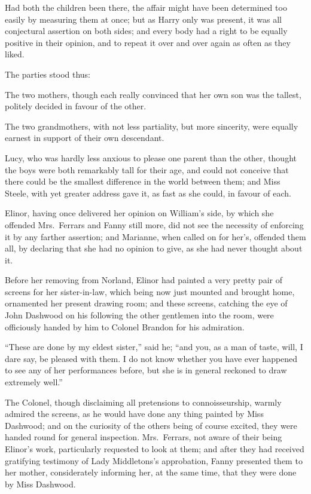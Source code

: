 Had both the children been there, the affair might
have been determined too easily by measuring them at once;
but as Harry only was present, it was all conjectural
assertion on both sides; and every body had a right to
be equally positive in their opinion, and to repeat it
over and over again as often as they liked.

The parties stood thus:

The two mothers, though each really convinced that
her own son was the tallest, politely decided in favour
of the other.

The two grandmothers, with not less partiality,
but more sincerity, were equally earnest in support
of their own descendant.

Lucy, who was hardly less anxious to please one parent
than the other, thought the boys were both remarkably tall
for their age, and could not conceive that there could
be the smallest difference in the world between them;
and Miss Steele, with yet greater address gave it,
as fast as she could, in favour of each.

Elinor, having once delivered her opinion on
William's side, by which she offended Mrs.\ Ferrars and
Fanny still more, did not see the necessity of enforcing
it by any farther assertion; and Marianne, when called
on for her's, offended them all, by declaring that she
had no opinion to give, as she had never thought about it.

Before her removing from Norland, Elinor had painted
a very pretty pair of screens for her sister-in-law,
which being now just mounted and brought home,
ornamented her present drawing room; and these screens,
catching the eye of John Dashwood on his following
the other gentlemen into the room, were officiously
handed by him to Colonel Brandon for his admiration.

``These are done by my eldest sister,'' said he; ``and you,
as a man of taste, will, I dare say, be pleased with them.
I do not know whether you have ever happened to see any
of her performances before, but she is in general reckoned
to draw extremely well.''

The Colonel, though disclaiming all pretensions
to connoisseurship, warmly admired the screens, as he
would have done any thing painted by Miss Dashwood;
and on the curiosity of the others being of course excited,
they were handed round for general inspection.
Mrs.\ Ferrars, not aware of their being Elinor's work,
particularly requested to look at them; and after they had
received gratifying testimony of Lady Middletons's approbation,
Fanny presented them to her mother, considerately informing
her, at the same time, that they were done by Miss Dashwood.

